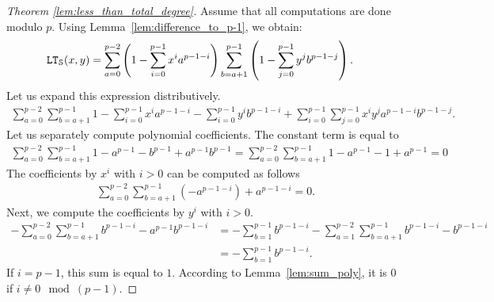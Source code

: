   \begin{proof}[Theorem \ref{lem:less_than_total_degree}]
    Assume that all computations are done modulo $p$.
    Using Lemma~\ref{lem:difference_to_p-1}, we obtain:
    \begin{align*}
      \mathtt{LT}_{\mathcal{S}}(x,y) &=  \sum_{a = 0}^{p-2} \left(1-\sum_{i=0}^{p-1} x^i a^{p-1-i}\right) \sum_{b=a+1}^{p-1} \left(1-\sum_{j=0}^{p-1} y^j b^{p-1-j}\right).
    \end{align*}
    Let us expand this expression distributively.
    \begin{align*}
      \sum_{a = 0}^{p-2} \sum_{b=a+1}^{p-1} 1 - \sum_{i=0}^{p-1} x^i a^{p-1-i} - \sum_{i=0}^{p-1} y^i b^{p-1-i} + \sum_{i=0}^{p-1} \sum_{j=0}^{p-1} x^i y^j a^{p-1-i} b^{p-1-j}.
    \end{align*}
    Let us separately compute polynomial coefficients.
    The constant term is equal to
    \begin{align*}
      \sum_{a = 0}^{p-2} \sum_{b=a+1}^{p-1} 1 - a^{p-1} - b^{p-1} + a^{p-1} b^{p-1} = \sum_{a = 0}^{p-2} \sum_{b=a+1}^{p-1} 1 - a^{p-1} - 1 + a^{p-1} = 0 
    \end{align*}
    The coefficients by $x^i$ with $i > 0$ can be computed as follows
    \begin{align*}
      \sum_{a = 0}^{p-2} \sum_{b=a+1}^{p-1} \left(-a^{p-1-i}\right) + a^{p-1-i} = 0.
    \end{align*}
    Next, we compute the coefficients by $y^i$ with $i > 0$.
    \begin{align*}
      -\sum_{a = 0}^{p-2} \sum_{b=a+1}^{p-1} b^{p-1-i} - a^{p-1} b^{p-1-i} &= -\sum_{b=1}^{p-1} b^{p-1-i} - \sum_{a = 1}^{p-2} \sum_{b=a+1}^{p-1} b^{p-1-i} - b^{p-1-i} \\
      &= -\sum_{b=1}^{p-1} b^{p-1-i}.
    \end{align*}
    If $i = p-1$, this sum is equal to $1$.
    According to Lemma~\ref{lem:sum_poly}, it is $0$ if $i \ne 0 \mod (p-1)$.
    

\end{proof}
